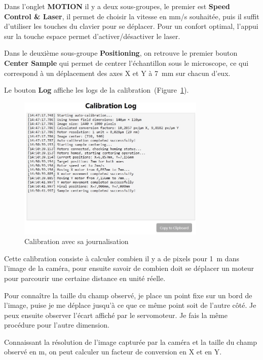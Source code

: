 Dans l'onglet \textcolor[RGB]{241,158,56}{\textbf{MOTION}} il y a deux sous-groupes, le premier est \textbf{Speed Control \& Laser}, il permet de choisir la vitesse en mm/s souhaitée, puis il suffit d'utiliser les touches du clavier pour se déplacer. Pour un confort optimal, l'appui sur la touche espace permet d'activer/désactiver le laser.

\newpage
Dans le deuxième sous-groupe \textbf{Positioning}, on retrouve le premier bouton \textcolor[RGB]{241,158,56}{\textbf{Center Sample}} qui permet de centrer l'échantillon sous le microscope, ce qui correspond à un déplacement des axes X et Y à 7~mm sur chacun d'eux.

Le bouton \textcolor[RGB]{102,125,138}{\textbf{Log}} affiche les logs de la calibration~(Figure~\ref{Calibration_Center_logs}).
\begin{figure}[H]
    \centering
    \includegraphics[width=0.8\textwidth]{assets/figures/Application_ServoVision/Calibration_Center_logs.jpeg}
    \caption{Calibration avec sa journalisation}
    \label{Calibration_Center_logs}
\end{figure}
Cette calibration consiste à calculer combien il y a de pixels pour 1~\textmu m dans l'image de la caméra, pour ensuite savoir de combien doit se déplacer un moteur pour parcourir une certaine distance en unité réelle.

Pour connaître la taille du champ observé, je place un point fixe sur un bord de l'image, puise je me déplace jusqu'à ce que ce même point soit de l'autre côté. Je peux ensuite observer l'écart affiché par le servomoteur. Je fais la même procédure pour l'autre dimension.

Connaissant la résolution de l'image capturée par la caméra et la taille du champ observé en \textmu m, on peut calculer un facteur de conversion en X et en Y.

